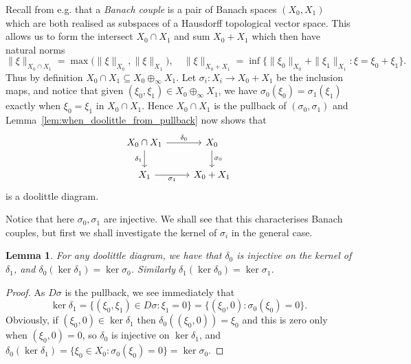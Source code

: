 \documentclass[a4paper,11pt]{article}
\theoremstyle{plain}
\newtheorem{lemma}[proposition]{Lemma}
\theoremstyle{remark}
\begin{document}
Recall from e.g. \cite{BL_Interpolation_Sps_Book} that a \emph{Banach couple} is a pair of Banach spaces $(X_0, X_1)$ which are both realised as subspaces of a Hausdorff topological vector space.  This allows us to form the intersect $X_0 \cap X_1$ and sum $X_0 + X_1$ which then have natural norms
\[ \|\xi\|_{X_0 \cap X_1} = \max\big( \|\xi\|_{X_0}, \|\xi\|_{X_1} \big), \quad
\|\xi\|_{X_0+X_1} = \inf\{ \|\xi_0\|_{X_0} + \|\xi_1\|_{X_1} : \xi = \xi_0+\xi_1 \}. \]
Thus by definition $X_0 \cap X_1 \subseteq X_0 \oplus_\infty X_1$.  Let $\sigma_i \colon X_i \to X_0 + X_1$ be the inclusion maps, and notice that given $(\xi_0,\xi_1) \in X_0 \oplus_\infty X_1$, we have $\sigma_0(\xi_0) = \sigma_1(\xi_1)$ exactly when $\xi_0 = \xi_1$ in $X_0 \cap X_1$.  Hence $X_0 \cap X_1$ is the pullback of $(\sigma_0, \sigma_1)$ and Lemma~\ref{lem:when_doolittle_from_pullback} now shows that
\[ \begin{tikzcd}
X_0 \cap X_1 \arrow[r, "\delta_0"] \arrow[d, "\delta_1"'] & X_0 \arrow[d, "\sigma_0"] \\
X_1 \arrow[r, "\sigma_1"'] & X_0+X_1
\end{tikzcd} \]
is a doolittle diagram.

Notice that here $\sigma_0, \sigma_1$ are injective.  We shall see that this characterises Banach couples, but first we shall investigate the kernel of $\sigma_i$ in the general case.

\begin{lemma}\label{lem:kernels_maps}
For any doolittle diagram, we have that $\delta_0$ is injective on the kernel of $\delta_1$, and $\delta_0(\ker \delta_1) = \ker \sigma_0$.  Similarly $\delta_1(\ker \delta_0) = \ker \sigma_1$.
\end{lemma}
\begin{proof}
As $D\sigma$ is the pullback, we see immediately that
\[ \ker\delta_1 = \{ (\xi_0,\xi_1) \in D\sigma : \xi_1 = 0 \}
= \{ (\xi_0, 0) : \sigma_0(\xi_0) = 0 \}. \]
Obviously, if $(\xi_0,0) \in \ker\delta_1$ then $\delta_0((\xi_0,0)) = \xi_0$ and this is zero only when $(\xi_0,0) = 0$, so $\delta_0$ is injective on $\ker\delta_1$, and $\delta_0(\ker\delta_1) = \{ \xi_0\in X_0 : \sigma_0(\xi_0)=0 \} = \ker\sigma_0$.
\end{proof}
\end{document}
